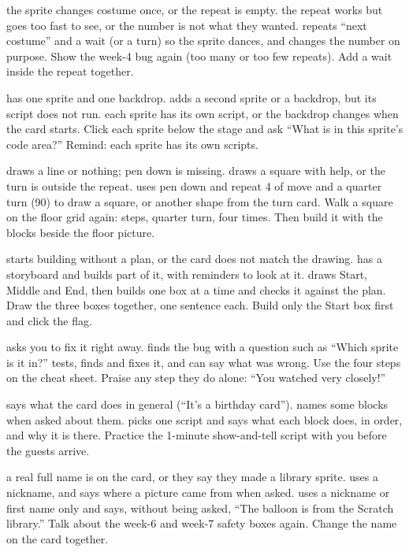   {the sprite changes costume once, or the repeat is empty.}
  {the repeat works but goes too fast to see, or the number is not what they wanted.}
  {repeats \enquote{next costume} and a wait (or a turn) so the sprite dances, and changes the number on purpose.}
  {Show the week-4 bug again (too many or too few repeats). Add a wait inside the repeat together.}

  {has one sprite and one backdrop.}
  {adds a second sprite or a backdrop, but its script does not run.}
  {each sprite has its own script, or the backdrop changes when the card starts.}
  {Click each sprite below the stage and ask \enquote{What is in this sprite's code area?} Remind: each sprite has its own scripts.}

  {draws a line or nothing; pen down is missing.}
  {draws a square with help, or the turn is outside the repeat.}
  {uses pen down and repeat 4 of move and a quarter turn (90) to draw a square, or another shape from the turn card.}
  {Walk a square on the floor grid again: steps, quarter turn, four times. Then build it with the blocks beside the floor picture.}

  {starts building without a plan, or the card does not match the drawing.}
  {has a storyboard and builds part of it, with reminders to look at it.}
  {draws Start, Middle and End, then builds one box at a time and checks it against the plan.}
  {Draw the three boxes together, one sentence each. Build only the Start box first and click the flag.}

  {asks you to fix it right away.}
  {finds the bug with a question such as \enquote{Which sprite is it in?}}
  {tests, finds and fixes it, and can say what was wrong.}
  {Use the four steps on the cheat sheet. Praise any step they do alone: \enquote{You watched very closely!}}

  {says what the card does in general (\enquote{It's a birthday card}).}
  {names some blocks when asked about them.}
  {picks one script and says what each block does, in order, and why it is there.}
  {Practice the 1-minute show-and-tell script with you before the guests arrive.}

  {a real full name is on the card, or they say they made a library sprite.}
  {uses a nickname, and says where a picture came from when asked.}
  {uses a nickname or first name only and says, without being asked, \enquote{The balloon is from the Scratch library.}}
  {Talk about the week-6 and week-7 safety boxes again. Change the name on the card together.}

